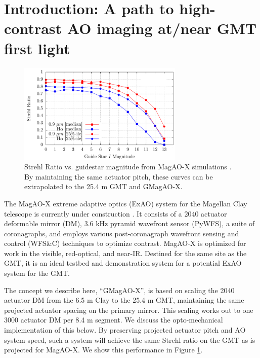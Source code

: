 \documentclass[12pt,preprint]{aastex}
\begin{document}
\section{Introduction: A path to high-contrast AO imaging at/near GMT first light} \label{sec:intro}

\begin{figure}
\centering
\vspace{-0.3in}
\includegraphics[width=3.1in]{figures/fig1.png}
\vspace{-0.1in}
\caption{ Strehl Ratio vs. guidestar magnitude from MagAO-X simulations \citep{2018SPIE10703E..09M}.  By maintaining the same actuator pitch, these curves can be extrapolated to the 25.4 m GMT and GMagAO-X. \label{fig:strehl} }
\end{figure}

The MagAO-X extreme adaptive optics (ExAO) system for the Magellan Clay telescope is currently under construction \citep{2018SPIE10703E..09M, 2018SPIE10703E..4YC}.  It consists of a 2040 actuator deformable mirror (DM), 3.6 kHz pyramid wavefront sensor (PyWFS), a suite of coronagraphs, and employs various post-coronagraph wavefront sensing and control (WFS\&C) techniques to optimize contrast.  MagAO-X is optimized for work in the visible, red-optical, and near-IR.  Destined for the same site as the GMT, it is an ideal testbed and demonstration system for a potential ExAO system for the GMT.

The concept we describe here, ``GMagAO-X'', is based on scaling the 2040 actuator DM from the 6.5 m Clay to the 25.4 m GMT, maintaining the same projected actuator spacing on the primary mirror.  This scaling works out to one 3000 actuator DM per 8.4 m segment.  We discuss the opto-mechanical implementation of this below.  By preserving projected actuator pitch and AO system speed, such a system will achieve the same Strehl ratio on the GMT as is projected for MagAO-X.  We show this performance in Figure \ref{fig:strehl}.
\end{document}
